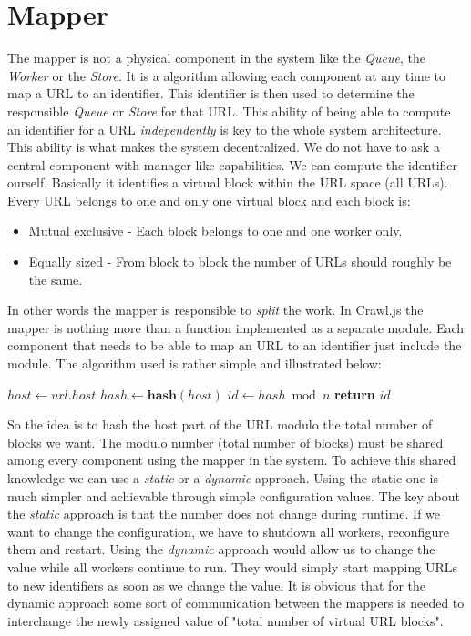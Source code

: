 \section{Mapper}
\label{mapper}
The mapper is not a physical component in the system like the \emph{Queue}, the \emph{Worker} or the \emph{Store}. It is a algorithm allowing each component at any time to map a URL to an identifier. This identifier is then used to determine the responsible \emph{Queue} or \emph{Store} for that URL.
This ability of being able to compute an identifier for a URL \emph{independently} is key to the whole system architecture. This ability is what makes the system decentralized. We do not have to ask a central component with manager like capabilities. We can compute the identifier ourself. Basically it identifies a virtual block within the URL space (all URLs). Every URL belongs to one and only one virtual block and each block is:
\begin{itemize}
  \item Mutual exclusive - Each block belongs to one and one worker only.
  \item Equally sized - From block to block the number of URLs should roughly be the same.
\end{itemize}

In other words the mapper is responsible to \emph{split} the work. In Crawl.js the mapper is nothing more than a function implemented as a separate module. Each component that needs to be able to map an URL to an identifier just include the module. The algorithm used is rather simple and illustrated below:
\begin{algorithmic}[0]
\State $host \gets url.host$
\State $hash \gets \textbf{hash}(host)$
\State $id \gets hash \bmod n$
\State \textbf{return} $id$
\EndFunction
\end{algorithmic}

So the idea is to hash the host part of the URL modulo the total number of blocks we want. The modulo number (total number of blocks) must be shared among every component using the mapper in the system.
To achieve this shared knowledge we can use a \emph{static} or a \emph{dynamic} approach. Using the static one is much simpler and achievable through simple configuration values. The key about the \emph{static} approach is that the number does not change during runtime. If we want to change the configuration, we have to shutdown all workers, reconfigure them and restart. Using the \emph{dynamic} approach would allow us to change the value while all workers continue to run. They would simply start mapping URLs to new identifiers as soon as we change the value. It is obvious that for the dynamic approach some sort of communication between the mappers is needed to interchange the newly assigned value of "total number of virtual URL blocks".

